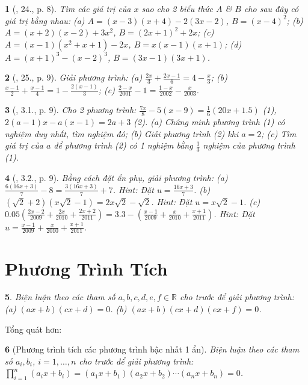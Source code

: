 \documentclass{article}
\newtheorem{baitoan}{}
\begin{document}
\begin{baitoan}[\cite{SBT_Toan_8_tap_2}, 24., p. 8]
	Tìm các giá trị của $x$ sao cho 2 biểu thức $A$ \& $B$ cho sau đây có giá trị bằng nhau: (a) $A = (x - 3)(x + 4) - 2(3x - 2)$, $B = (x - 4)^2$; (b) $A = (x + 2)(x - 2) + 3x^2$, $B = (2x + 1)^2 + 2x$; (c) $A = (x - 1)(x^2 + x + 1) - 2x$, $B = x(x - 1)(x + 1)$; (d) $A = (x + 1)^3 - (x - 2)^3$, $B = (3x - 1)(3x + 1)$.
\end{baitoan}

\begin{baitoan}[\cite{SBT_Toan_8_tap_2}, 25., p. 9]
	Giải phương trình: (a) $\frac{2x}{3} + \frac{2x - 1}{6} = 4 - \frac{x}{3}$; (b) $\frac{x - 1}{2} + \frac{x - 1}{4} = 1 - \frac{2(x - 1)}{3}$; (c) $\frac{2 - x}{2001} - 1 = \frac{1 - x}{2002} - \frac{x}{2003}$.
\end{baitoan}

\begin{baitoan}[\cite{SBT_Toan_8_tap_2}, 3.1., p. 9]
	Cho 2 phương trình: $\frac{7x}{8} - 5(x - 9) = \frac{1}{6}(20x + 1.5)$ (1), $2(a - 1)x - a(x - 1) = 2a + 3$ (2). (a) Chứng minh phương trình (1) có nghiệm duy nhất, tìm nghiệm đó; (b) Giải phương trình (2) khi $a = 2$; (c) Tìm giá trị của $a$ để phương trình (2) có 1 nghiệm bằng $\frac{1}{3}$ nghiệm của phương trình (1).
\end{baitoan}

\begin{baitoan}[\cite{SBT_Toan_8_tap_2}, 3.2., p. 9]
	Bằng cách đặt ẩn phụ, giải phương trình: (a) $\frac{6(16x + 3)}{7} - 8 = \frac{3(16x + 3)}{7} + 7$. Hint: Đặt $u = \frac{16x + 3}{7}$. (b) $(\sqrt{2} + 2)(x\sqrt{2} - 1) = 2x\sqrt{2} - \sqrt{2}$. Hint: Đặt $u = x\sqrt{2} - 1$. (c) $0.05\left(\frac{2x - 2}{2009} + \frac{2x}{2010} + \frac{2x + 2}{2011}\right) = 3.3 - \left(\frac{x - 1}{2009} + \frac{x}{2010} + \frac{x + 1}{2011}\right)$. Hint: Đặt $u = \frac{x - 1}{2009} + \frac{x}{2010} + \frac{x + 1}{2011}$.
\end{baitoan}


\section{Phương Trình Tích}

\begin{baitoan}
	Biện luận theo các tham số $a,b,c,d,e,f\in\mathbb{R}$ cho trước để giải phương trình: (a) $(ax + b)(cx + d) = 0$. (b) $(ax + b)(cx + d)(ex + f) = 0$.
\end{baitoan}
Tổng quát hơn:
\begin{baitoan}[Phương trình tích các phương trình bậc nhất 1 ẩn]
	Biện luận theo các tham số $a_i,b_i$, $i = 1,\ldots,n$ cho trước để giải phương trình: $\prod_{i=1}^n (a_ix + b_i) = (a_1x + b_1)(a_2x + b_2)\cdots(a_nx + b_n) = 0$.
\end{baitoan}
\end{document}
